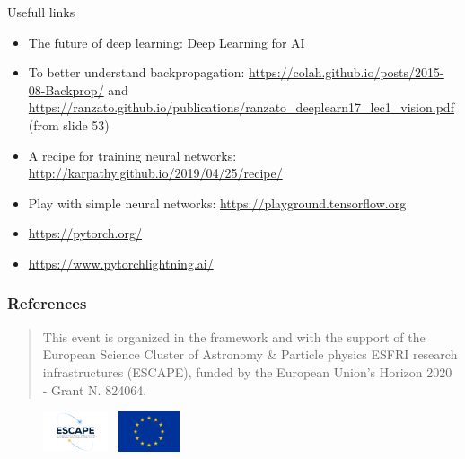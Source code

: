 \documentclass[usenames,dvipsnames]{beamer}
\begin{document}
    \begin{frame}{\secname}
        Usefull links
        {\footnotesize
        \begin{itemize}
            \item The future of deep learning: \href{https://cacm.acm.org/magazines/2021/7/253464-deep-learning-for-ai/fulltext}{Deep Learning for AI}
            \item To better understand backpropagation: \url{https://colah.github.io/posts/2015-08-Backprop/} and \url{https://ranzato.github.io/publications/ranzato_deeplearn17_lec1_vision.pdf} (from slide 53)
            \item A recipe for training neural networks: \url{http://karpathy.github.io/2019/04/25/recipe/}
            \item Play with simple neural networks: \url{https://playground.tensorflow.org}
            \item \url{https://pytorch.org/}
            \item \url{https://www.pytorchlightning.ai/}
        \end{itemize}
        }
    \end{frame}
    
    \begin{frame}[allowframebreaks]
        \frametitle{References}
        \tiny
        
        
    \end{frame}
    
    \begin{frame}
        \begin{quote}
            This event is organized in the framework and with the support of the European Science Cluster of Astronomy \& Particle physics ESFRI research infrastructures (ESCAPE), funded by the European Union's Horizon 2020 - Grant N. 824064.
        \end{quote}
        \begin{figure}
            \centering
                \includegraphics[height=1.2cm]{figures/logo-Escape_0.png}\hspace*{.75cm}~%
                \includegraphics[height=1.2cm]{figures/Flag_of_Europe.png}
        \end{figure}
        
    \end{frame}
    
    
\end{document}
